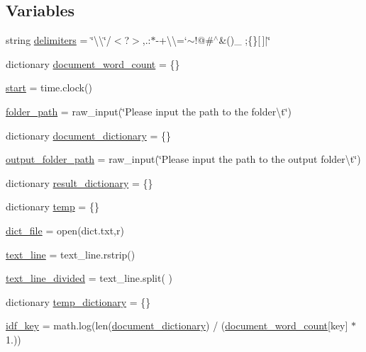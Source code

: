\subsection*{Variables}
\begin{DoxyCompactItemize}
\item 
string \hyperlink{namespacediff_a46e2544bf0f797b8d42f4985d4b9bf0a}{delimiters} = \char`\"{}\textbackslash{}\textquotesingle{}\textbackslash{}\char`\"{}/$<$?$>$,.\+:$\ast$-\/+\textbackslash{}\textbackslash{}=`$\sim$!@\#$^\wedge$\&()\+\_\+ ;\{\}\mbox{[}$\,$\mbox{]}$\vert$\char`\"{}
\item 
dictionary \hyperlink{namespacediff_af16edaaafe4787892cb925870fd0d108}{document\+\_\+word\+\_\+count} = \{\}
\item 
\hyperlink{namespacediff_ac1dbbabcf481dbdd8253f435c6841b59}{start} = time.\+clock()
\item 
\hyperlink{namespacediff_adccd64c100d50ed0e87d46c33e8636eb}{folder\+\_\+path} = raw\+\_\+input(\char`\"{}Please input the path to the folder\textbackslash{}t\char`\"{})
\item 
dictionary \hyperlink{namespacediff_a7d02a567fcd601900d3960bef0191cea}{document\+\_\+dictionary} = \{\}
\item 
\hyperlink{namespacediff_aed454348ccff9ceb835a6c22de15fa95}{output\+\_\+folder\+\_\+path} = raw\+\_\+input(\char`\"{}Please input the path to the output folder\textbackslash{}t\char`\"{})
\item 
dictionary \hyperlink{namespacediff_a08d29f91abd1bc75aa7d8ecb3aa39c91}{result\+\_\+dictionary} = \{\}
\item 
dictionary \hyperlink{namespacediff_a9b7319edd5fe67e6804984652b758844}{temp} = \{\}
\item 
\hyperlink{namespacediff_a1c4dd03a1a71df999349462c9dd9994d}{dict\+\_\+file} = open(\textquotesingle{}dict.\+txt\textquotesingle{},\textquotesingle{}r\textquotesingle{})
\item 
\hyperlink{namespacediff_afec29e46f49378a5b7b3495eecdb5e55}{text\+\_\+line} = text\+\_\+line.\+rstrip()
\item 
\hyperlink{namespacediff_ac8b8b94593712a4b907001ab1fa122c7}{text\+\_\+line\+\_\+divided} = text\+\_\+line.\+split(\textquotesingle{} \textquotesingle{})
\item 
dictionary \hyperlink{namespacediff_aca04823d91158ba2b053d46e3550516d}{temp\+\_\+dictionary} = \{\}
\item 
\hyperlink{namespacediff_a1798972d3d6361a79c16d8470bf3471d}{idf\+\_\+key} = math.\+log(len(\hyperlink{namespacediff_a7d02a567fcd601900d3960bef0191cea}{document\+\_\+dictionary}) / (\hyperlink{namespacediff_af16edaaafe4787892cb925870fd0d108}{document\+\_\+word\+\_\+count}\mbox{[}key\mbox{]} $\ast$ 1.))

\end{DoxyCompactItemize}
